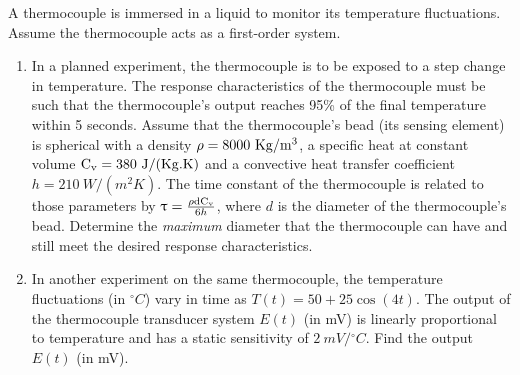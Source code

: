 \documentclass[a4paper,11pt,dvipsnames]{book}
\begin{document}
\begin{question}[subtitle=Midterm 2017]
A thermocouple is immersed in a liquid to monitor its temperature fluctuations. Assume the thermocouple acts as a first-order system.
\begin{enumerate}
\item In a planned experiment, the thermocouple is to be exposed to a step change in temperature. The
response characteristics of the thermocouple must be such that the thermocouple’s output reaches 95\% of the final temperature within 5 seconds. Assume that the thermocouple’s bead (its sensing element) is spherical with  a density ${\rm \rho = 8000 ~Kg/m^3}$, a specific heat at constant volume ${\rm C_v = 380 ~J/(Kg.K)}$ and a convective heat transfer coefficient $h = 210 ~W/(m^2 K)$. The time constant of the thermocouple is related to those parameters by $\uptau = \frac{\rm \rho d C_v}{6h}$, where $d$ is the diameter of the thermocouple's bead. Determine the \emph{maximum} diameter that the
thermocouple can have and still meet the desired response characteristics.
\item In another experiment on the same thermocouple, the temperature fluctuations (in ${}^\circ C$) vary in time as $T(t) = 50 + 25\cos(4t)$. The output of the thermocouple transducer system $E(t)$ (in mV) is linearly proportional to temperature and has a static sensitivity of $2~ mV/{}^\circ C$. Find the output $E(t)$ (in mV).
\end{enumerate}

\examspace*{30em}

\end{question}
\begin{solution}
\end{solution}
\end{document}
